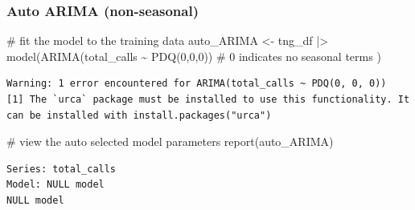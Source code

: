 \documentclass[
  letterpaper,
  DIV=11,
  numbers=noendperiod]{scrartcl}
\newenvironment{Shaded}{\begin{snugshade}}{\end{snugshade}}
\newcommand{\CommentTok}[1]{\textcolor[rgb]{0.37,0.37,0.37}{#1}}
\newcommand{\DecValTok}[1]{\textcolor[rgb]{0.68,0.00,0.00}{#1}}
\newcommand{\FunctionTok}[1]{\textcolor[rgb]{0.28,0.35,0.67}{#1}}
\newcommand{\NormalTok}[1]{\textcolor[rgb]{0.00,0.23,0.31}{#1}}
\newcommand{\OtherTok}[1]{\textcolor[rgb]{0.00,0.23,0.31}{#1}}
\newcommand{\SpecialCharTok}[1]{\textcolor[rgb]{0.37,0.37,0.37}{#1}}
\begin{document}
\subsubsection{Auto ARIMA (non-seasonal)}\label{auto-arima-non-seasonal}

\begin{Shaded}
\begin{Highlighting}[]
\CommentTok{\# fit the model to the training data}
\NormalTok{auto\_ARIMA }\OtherTok{\textless{}{-}}\NormalTok{ tng\_df }\SpecialCharTok{|\textgreater{}}
  \FunctionTok{model}\NormalTok{(}\FunctionTok{ARIMA}\NormalTok{(total\_calls }\SpecialCharTok{\textasciitilde{}} \FunctionTok{PDQ}\NormalTok{(}\DecValTok{0}\NormalTok{,}\DecValTok{0}\NormalTok{,}\DecValTok{0}\NormalTok{)) }\CommentTok{\# 0 indicates no seasonal terms}
\NormalTok{        )}
\end{Highlighting}
\end{Shaded}

\begin{verbatim}
Warning: 1 error encountered for ARIMA(total_calls ~ PDQ(0, 0, 0))
[1] The `urca` package must be installed to use this functionality. It can be installed with install.packages("urca")
\end{verbatim}

\begin{Shaded}
\begin{Highlighting}[]
\CommentTok{\# view the auto selected model parameters}
\FunctionTok{report}\NormalTok{(auto\_ARIMA)}
\end{Highlighting}
\end{Shaded}

\begin{verbatim}
Series: total_calls 
Model: NULL model 
NULL model
\end{verbatim}
\end{document}
